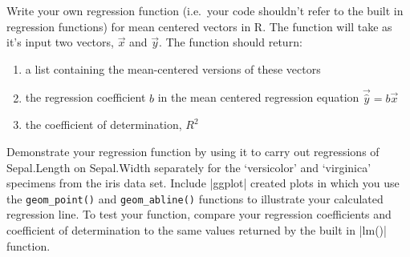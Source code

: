 \begin{assignment}
Write your own regression function (i.e.~your
code shouldn't refer to the built in regression functions) for mean
centered vectors in R. The function will take as it's input two vectors,
$\vec{x}$ and $\vec{y}$. The function should return:

\begin{enumerate}[1.]
\item
  a list containing the mean-centered versions of these vectors
\item
  the regression coefficient $b$ in the mean centered regression
  equation $\vec{\widehat{y}} = b\vec{x}$
\item
  the coefficient of determination, $R^2$
\end{enumerate}
Demonstrate your regression function by using it to carry out
regressions of Sepal.Length on Sepal.Width separately for the `versicolor'
and `virginica' specimens from the iris data set. Include |ggplot| created plots in which you use the
\lstinline!geom_point()! and \lstinline!geom_abline()! functions to illustrate your
calculated regression line. To test your function, compare your regression coefficients and coefficient of determination to the same values returned by the built in |lm()| function.

\end{assignment}



